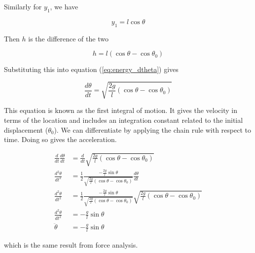 Similarly for $y_1$, we have

\begin{equation*}
  y_1 = l\cos\theta
\end{equation*}

Then $h$ is the difference of the two

\begin{equation*}
  h = l(\cos\theta - \cos\theta_0)
\end{equation*}

Substituting this into equation (\ref{eq:energy_dtheta}) gives

\begin{equation*}
  \frac{d\theta}{dt} = \sqrt{\frac{2g}{l}(\cos\theta - \cos\theta_0)}
\end{equation*}

This equation is known as the first integral of motion. It gives the velocity in
terms of the location and includes an integration constant related to the
initial displacement ($\theta_0$). We can differentiate by applying the chain
rule with respect to time. Doing so gives the acceleration.

\begin{align*}
  \frac{d}{dt}\frac{d\theta}{dt} &=
    \frac{d}{dt}\sqrt{\frac{2g}{l}(\cos\theta - \cos\theta_0)} \\
  \frac{d^2\theta}{dt^2} &= \frac{1}{2}\frac
    {-\frac{2g}{l}\sin\theta}
    {\sqrt{\frac{2g}{l}(\cos\theta - \cos\theta_0)}}\frac{d\theta}{dt} \\
  \frac{d^2\theta}{dt^2} &= \frac{1}{2}\frac
    {-\frac{2g}{l}\sin\theta}
    {\sqrt{\frac{2g}{l}(\cos\theta - \cos\theta_0)}}
    \sqrt{\frac{2g}{l}(\cos\theta - \cos\theta_0)} \\
  \frac{d^2\theta}{dt^2} &= -\frac{g}{l}\sin\theta \\
  \ddot{\theta} &= -\frac{g}{l}\sin\theta
\end{align*}

which is the same result from force analysis.
